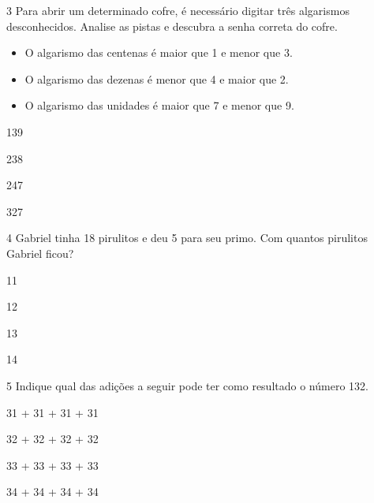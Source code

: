 \num{3} Para abrir um determinado cofre, é necessário digitar três algarismos
desconhecidos. Analise as pistas e descubra a senha correta do cofre.

\begin{itemize}
\item
  O algarismo das centenas é maior que 1 e menor que 3.
\item
  O algarismo das dezenas é menor que 4 e maior que 2.
\item
  O algarismo das unidades é maior que 7 e menor que 9.
\end{itemize}


\begin{escolha}[itemsep=-5pt]
\item 139

\item 238

\item 247

\item 327
\end{escolha}

\num{4} Gabriel tinha 18 pirulitos e deu 5 para seu primo. Com quantos
pirulitos Gabriel ficou?

\begin{escolha}[itemsep=-5pt]
\begin{multicols}{2}
\item 11

\item 12

\item 13

\item 14
\end{multicols}
\end{escolha}

\num{5} Indique qual das adições a seguir pode ter como resultado o número 132.

\begin{escolha}[itemsep=-5pt]
\item 31 + 31 + 31 + 31

\item 32 + 32 + 32 + 32

\item 33 + 33 + 33 + 33

\item 34 + 34 + 34 + 34
\end{escolha}

